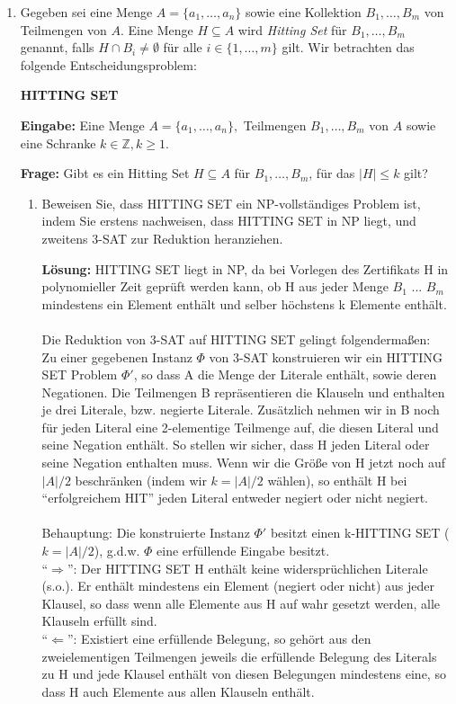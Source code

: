 \documentclass[12pt,a4paper]{scrartcl}
\newcommand{\prob}[1]{\vspace{.5\baselineskip}\begin{addmargin}[15pt]{0pt}\textbf{#1}\end{addmargin}}
\newcommand{\ein}[1]{\vspace{.5\baselineskip}\begin{addmargin}[15pt]{0pt}\textbf{Eingabe: }#1\end{addmargin}}
\newcommand{\fra}[1]{\vspace{.5\baselineskip}\begin{addmargin}[15pt]{0pt}\textbf{Frage: }#1\end{addmargin}}
\newcommand{\loesung}[1]{\vspace{.5\baselineskip}\begin{addmargin}[0pt]{0pt}\textbf{Lösung: }#1\end{addmargin}}
\begin{document}
\begin{enumerate}
\item Gegeben sei eine Menge $A = \{a_1,\ldots,a_n\}$ sowie eine Kollektion $B_1,\ldots,B_m$ von Teilmengen von $A$. Eine Menge $H \subseteq A$ wird \emph{Hitting Set} für $B_1,\ldots,B_m$ genannt, falls $H \cap B_i \neq \emptyset$ für alle $i \in \{1,\ldots,m\}$ gilt. Wir betrachten das folgende Entscheidungsproblem:

	\prob{HITTING SET}
	\ein{Eine Menge $A = \{a_1,\ldots,a_n\},$ Teilmengen $B_1,\ldots,B_m$ von $A$ sowie eine Schranke $k \in \mathds{Z}, k \geq 1$.}
	\fra{Gibt es ein Hitting Set $H \subseteq A$ für $B_1,\ldots,B_m$, für das $|H| \leq k$ gilt?}
	\begin{enumerate}
	\item Beweisen Sie, dass HITTING SET ein NP-vollständiges Problem ist, indem Sie erstens nachweisen, dass HITTING SET in NP liegt, und zweitens 3-SAT zur Reduktion heranziehen.
	
	\loesung{
	HITTING SET liegt in NP, da bei Vorlegen des Zertifikats H in polynomieller Zeit geprüft werden kann, ob H aus jeder Menge $B_1$ ... $B_m$ mindestens ein Element enthält und selber höchstens k Elemente enthält.\\  \\
	Die Reduktion von 3-SAT auf HITTING SET gelingt folgendermaßen:\\
	Zu einer gegebenen Instanz $\Phi$ von 3-SAT konstruieren wir ein HITTING SET Problem $\Phi'$, so dass A die Menge der Literale enthält, sowie deren Negationen. Die Teilmengen B repräsentieren die Klauseln und enthalten je drei Literale, bzw. negierte Literale. Zusätzlich nehmen wir in B noch für jeden Literal eine 2-elementige Teilmenge auf, die diesen Literal und seine Negation enthält. So stellen wir sicher, dass H jeden Literal oder seine Negation enthalten muss. Wenn wir die Größe von H jetzt noch auf $|A| / 2$ beschränken (indem wir $k = |A| / 2$ wählen), so enthält H bei ``erfolgreichem HIT'' jeden Literal entweder negiert oder nicht negiert.\\ \\
	Behauptung: Die konstruierte Instanz $\Phi'$ besitzt einen k-HITTING SET ($k = |A| / 2$), g.d.w. $\Phi$ eine erfüllende Eingabe besitzt.\\
	``$\Rightarrow$'': Der HITTING SET H enthält keine widersprüchlichen Literale (s.o.). Er enthält mindestens ein Element (negiert oder nicht) aus jeder Klausel, so dass wenn alle Elemente aus H auf wahr gesetzt werden, alle Klauseln erfüllt sind.\\
	``$\Leftarrow$'': Existiert eine erfüllende Belegung, so gehört aus den zweielementigen Teilmengen jeweils die erfüllende Belegung des Literals zu H und jede Klausel enthält von diesen Belegungen mindestens eine, so dass H auch Elemente aus allen Klauseln enthält.\\
	
}
\end{enumerate}
\end{enumerate}
\end{document}

